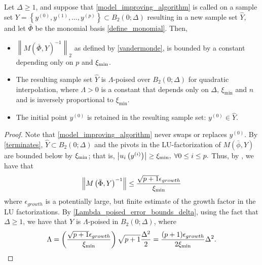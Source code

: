 \begin{theorem}
\label{set_is_poised}

Let $\Delta \ge 1$, and suppose that \cref{model_improving_algorithm} is called on a sample set 
$Y = \left\{y^{(0)}, y^{(1)}, \ldots, y^{(p)}\right\} \subset B_2(0; \Delta)$ 
resulting in a new sample set $\hat Y$,
and let $\bar{\Phi}$ be the monomial basis \cref{define_monomial}.
Then,
\begin{itemize}
\item $\left\|M(\bar \Phi, \hat Y)^{-1}\right\|_2$ as defined by \cref{vandermonde}, is bounded by a constant depending only on $p$ and $\xi_{\text{min}}$.
\item The resulting sample set $\hat Y$ is $\Lambda$-poised over $B_2\left(0;\Delta\right)$ for quadratic interpolation,
where $\Lambda > 0$ is a constant that depends only on $\Delta$, $\xi_{\text{min}}$ and $n$ and is inversely proportional to $\xi_{\text{min}}$.
\item The initial point $y^{(0)}$ is retained in the resulting sample set: $y^{(0)} \in \hat Y$.
\end{itemize}
\end{theorem}

\begin{proof}

Note that \cref{model_improving_algorithm} never swaps or replaces $y^{(0)}$.
By \cref{terminates},  $\hat Y \subset B_2(0;\Delta)$
and the pivots in the LU-factorization of $M(\bar{\phi},Y)$ are bounded below by $\xi_{\text{min}}$; that is,
$\left|u_i\left(y^{(i)}\right)\right| \ge \xi_{\text{min}}, \; \forall 0 \le i \le p.$
Thus, by 
\cite[Section 6.7, Exercise 3]{introduction_book}, 
 we have that 
\begin{align*}
\left\|M\left(\bar \Phi, Y\right)^{-1}\right\| \le \frac{\sqrt{p+1}\epsilon_{growth}}{\xi_{\text{min}}}
\end{align*}
where $\epsilon_{growth}$ is a potentially large, but finite estimate of the growth factor in the LU factorizations.   By  \cref{Lambda_poised_error_bounds_delta},  using the fact that $\Delta \ge 1$, we have that $Y$ is $\Lambda$-poised in $B_2(0;\Delta)$,  where 
\[\Lambda = \left(\frac{\sqrt{p+1}\epsilon_{growth}}{\xi_{\text{min}}}\right) \sqrt{p+1}  \frac{\Delta^2}{2} = \frac{(p+1) \epsilon_{growth}}{2\xi_{\text{min}}}\Delta^2.\]
%
%
%
%
\end{proof}


